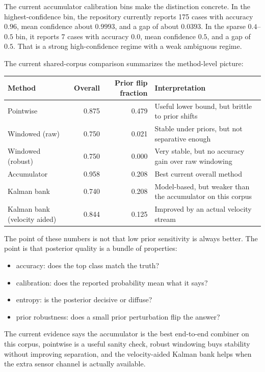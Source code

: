 \documentclass[11pt]{article}
\begin{document}
The current accumulator calibration bins make the distinction concrete. In the
highest-confidence bin, the repository currently reports 175 cases with
accuracy \(0.96\), mean confidence about \(0.9993\), and a gap of about
\(0.0393\). In the sparse \(0.4\)--\(0.5\) bin, it reports 7 cases with
accuracy \(0.0\), mean confidence \(0.5\), and a gap of \(0.5\). That is a
strong high-confidence regime with a weak ambiguous regime.

The current shared-corpus comparison summarizes the method-level picture:
\begin{center}
\small
\begin{tabularx}{\textwidth}{lrrX}
\toprule
Method & Overall & Prior flip fraction & Interpretation \\
\midrule
Pointwise & 0.875 & 0.479 & Useful lower bound, but brittle to prior shifts \\
Windowed (raw) & 0.750 & 0.021 & Stable under priors, but not separative enough \\
Windowed (robust) & 0.750 & 0.000 & Very stable, but no accuracy gain over raw windowing \\
Accumulator & 0.958 & 0.208 & Best current overall method \\
Kalman bank & 0.740 & 0.208 & Model-based, but weaker than the accumulator on this corpus \\
Kalman bank (velocity aided) & 0.844 & 0.125 & Improved by an actual velocity stream \\
\bottomrule
\end{tabularx}
\end{center}

The point of these numbers is not that low prior sensitivity is always better. The point is that posterior quality is a bundle of properties:
\begin{itemize}[leftmargin=1.5em]
  \item accuracy: does the top class match the truth?
  \item calibration: does the reported probability mean what it says?
  \item entropy: is the posterior decisive or diffuse?
  \item prior robustness: does a small prior perturbation flip the answer?
\end{itemize}
The current evidence says the accumulator is the best end-to-end combiner on this corpus, pointwise is a useful sanity check, robust windowing buys stability without improving separation, and the velocity-aided Kalman bank helps when the extra sensor channel is actually available.
\end{document}
